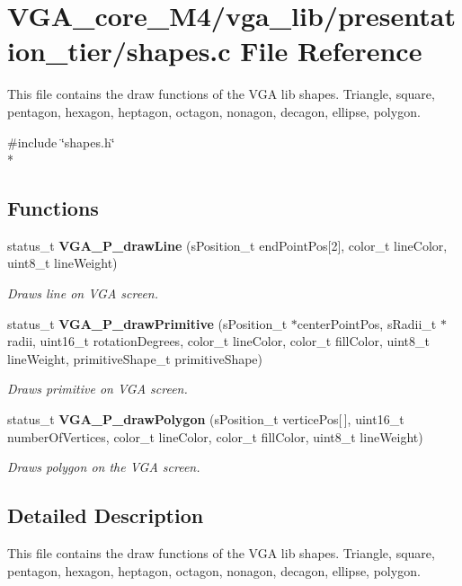 \section{V\+G\+A\+\_\+core\+\_\+\+M4/vga\+\_\+lib/presentation\+\_\+tier/shapes.c File Reference}
\label{shapes_8c}


This file contains the draw functions of the V\+GA lib shapes. Triangle, square, pentagon, hexagon, heptagon, octagon, nonagon, decagon, ellipse, polygon.  


{\ttfamily \#include \char`\"{}shapes.\+h\char`\"{}}\\*
\subsection*{Functions}
\begin{DoxyCompactItemize}
\item 
status\+\_\+t {\bf V\+G\+A\+\_\+\+P\+\_\+draw\+Line} (s\+Position\+\_\+t end\+Point\+Pos[2], color\+\_\+t line\+Color, uint8\+\_\+t line\+Weight)
\begin{DoxyCompactList}\small\item\em Draws line on V\+GA screen. \end{DoxyCompactList}\item 
status\+\_\+t {\bf V\+G\+A\+\_\+\+P\+\_\+draw\+Primitive} (s\+Position\+\_\+t $\ast$center\+Point\+Pos, s\+Radii\+\_\+t $\ast$radii, uint16\+\_\+t rotation\+Degrees, color\+\_\+t line\+Color, color\+\_\+t fill\+Color, uint8\+\_\+t line\+Weight, primitive\+Shape\+\_\+t primitive\+Shape)
\begin{DoxyCompactList}\small\item\em Draws primitive on V\+GA screen. \end{DoxyCompactList}\item 
status\+\_\+t {\bf V\+G\+A\+\_\+\+P\+\_\+draw\+Polygon} (s\+Position\+\_\+t vertice\+Pos[$\,$], uint16\+\_\+t number\+Of\+Vertices, color\+\_\+t line\+Color, color\+\_\+t fill\+Color, uint8\+\_\+t line\+Weight)
\begin{DoxyCompactList}\small\item\em Draws polygon on the V\+GA screen. \end{DoxyCompactList}\end{DoxyCompactItemize}


\subsection{Detailed Description}
This file contains the draw functions of the V\+GA lib shapes. Triangle, square, pentagon, hexagon, heptagon, octagon, nonagon, decagon, ellipse, polygon. 




